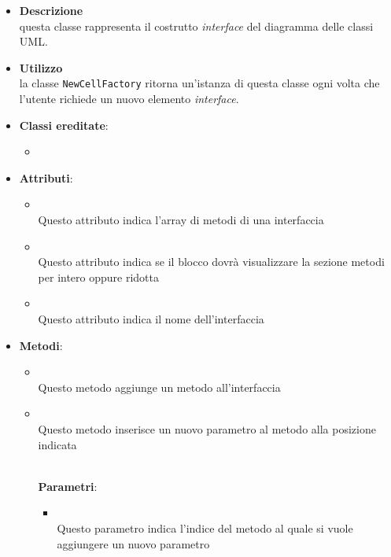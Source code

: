 \label{\nogloxy{swedesigner::client::model::celltypes::class::HxInterface}}
\begin{itemize}
\item \textbf{Descrizione}\\
questa classe rappresenta il costrutto \emph{interface} del diagramma delle classi UML.
\item \textbf{Utilizzo}\\
la classe \texttt{NewCellFactory} ritorna un'istanza di questa classe ogni volta che l'utente richiede un nuovo elemento \emph{interface}.
\item \textbf{Classi ereditate}:
\begin{itemize}
\item \hyperref[\nogloxy{swedesigner::client::model::celltypes::class::ClassDiagramElement}]{}
\end{itemize}
\item \textbf{Attributi}:
\begin{itemize}
\item {}
\\ Questo attributo indica l'array di metodi di una interfaccia
\item {}
\\ Questo attributo indica se il blocco dovrà visualizzare la sezione metodi per intero oppure ridotta

\item {}
\\ Questo attributo indica il nome dell'interfaccia

\end{itemize}
\item \textbf{Metodi}:
\begin{itemize}
\item {}
\\ Questo metodo aggiunge un metodo all'interfaccia
\item {}
\\ Questo metodo inserisce un nuovo parametro al metodo alla posizione indicata

\\ \textbf{Parametri}:
\begin{itemize}
\item {}
\\ Questo parametro indica l'indice del metodo al quale si vuole aggiungere un nuovo parametro


\end{itemize}
\end{itemize}
\end{itemize}
